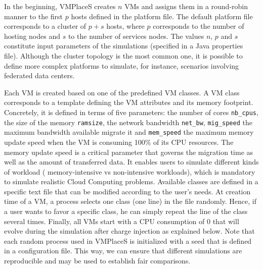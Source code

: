 \documentclass[conference]{IEEEtran}
\newcommand{\vmps}{VMPlaceS\xspace}
\begin{document}
In the beginning, \vmps creates $n$ VMs and assigns them in a
round-robin manner to the first $p$ hosts defined in the platform
file.  The default platform file corresponds to a cluster of $p+s$
hosts, where $p$ corresponds to the number of hosting nodes and $s$ to
the number of services nodes. The values $n$, $p$ and $s$ constitute
input parameters of the simulations (specified in a Java properties
file).
Although the cluster topology is the most
common one, it is possible to define more complex platforms to simulate,
for instance, scenarios involving federated data centers.

Each VM is created based on one of the predefined VM classes. A VM
class corresponds to a template defining the VM attributes and its
memory footprint. Concretely, it is
defined in terms of five parameters: the number of cores
\texttt{nb\_cpus}, the size of the memory \texttt{ramsize}, the
network bandwidth \texttt{net\_bw}, \texttt{mig\_speed} the maximum
bandwidth available migrate it and \texttt{mem\_speed} the maximum
memory update speed when the VM is consuming 100\% of its CPU
resources. The memory update speed is a critical parameter that
governs the migration time as well as the amount of transferred
data. It enables users to simulate different kinds of workload (\ie
memory-intensive vs non-intensive workloads), which is mandatory to
simulate realistic Cloud Computing problems.  Available classes are
defined in a specific text file that can be modified according to the
user's needs.    At creation time
of a VM, a process selects one class (\ie one line) in the file
randomly. Hence, if a user wants to favor a specific class, he can
simply repeat the line of the class several times. Finally, all VMs
start with a CPU consumption of 0 that will evolve during the
simulation after charge injection as explained below.  Note that each
random process used in \vmps is initialized with a seed that is
defined in a configuration file. This way, we can ensure that
different simulations are reproducible and may be used to establish
fair comparisons.
\end{document}
